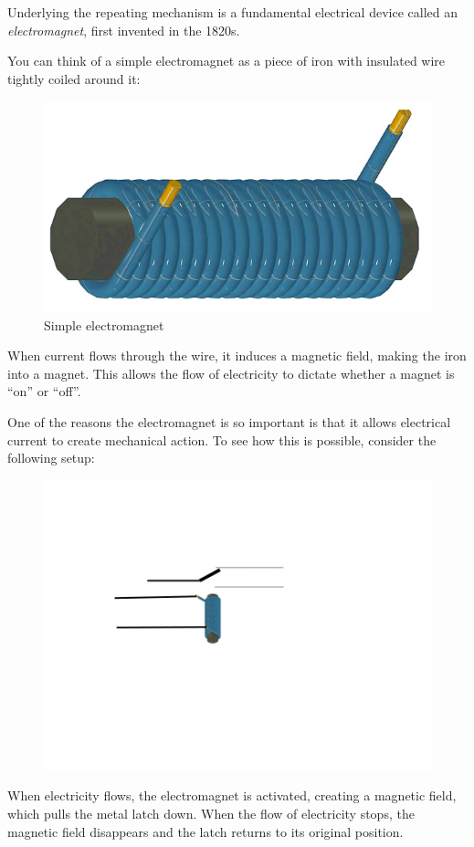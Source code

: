 \documentclass[UTF8]{book}
\begin{document}
\begin{CJK}{UTF8}{gbsn}
Underlying the repeating mechanism is a fundamental electrical device called an \emph{electromagnet}, first invented in the 1820s.

You can think of a simple electromagnet as a piece of iron with insulated wire tightly coiled around it:

\begin{figure}[H]
\centering
\includegraphics[width=0.8\linewidth]{electromagnet}
\caption{Simple electromagnet}
\end{figure}

When current flows through the wire, it induces a magnetic field, making the iron into a magnet. This allows the flow of electricity to dictate whether a magnet is ``on'' or ``off''.

One of the reasons the electromagnet is so important is that it allows electrical current to create mechanical action. To see how this is possible, consider the following setup:

\begin{figure}[H]
\centering
\includegraphics[width=0.8\linewidth]{electromagnet_with_latch}
\end{figure}

When electricity flows, the electromagnet is activated, creating a magnetic field, which pulls the metal latch down. When the flow of electricity stops, the magnetic field disappears and the latch returns to its original position.


\end{CJK}
\end{document}
